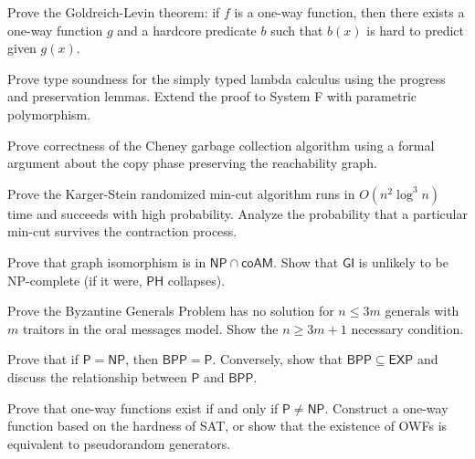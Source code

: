 \documentclass[12pt,a4paper]{exam}
\begin{document}
\begin{questions}
\vspace{0.3cm}

\question[5]
Prove the Goldreich-Levin theorem: if $f$ is a one-way function, then there exists a one-way function $g$ and a hardcore predicate $b$ such that $b(x)$ is hard to predict given $g(x)$.

\vspace{0.3cm}

\question[4]
Prove type soundness for the simply typed lambda calculus using the progress and preservation lemmas. Extend the proof to System F with parametric polymorphism.

\vspace{0.3cm}

\question[3]
Prove correctness of the Cheney garbage collection algorithm using a formal argument about the copy phase preserving the reachability graph.

\vspace{0.3cm}

\question[4]
Prove the Karger-Stein randomized min-cut algorithm runs in $O(n^2 \log^3 n)$ time and succeeds with high probability. Analyze the probability that a particular min-cut survives the contraction process.

\vspace{0.3cm}

\question[6]
Prove that graph isomorphism is in $\mathsf{NP} \cap \mathsf{coAM}$. Show that $\mathsf{GI}$ is unlikely to be NP-complete (if it were, $\mathsf{PH}$ collapses).

\vspace{0.3cm}

\question[3]
Prove the Byzantine Generals Problem has no solution for $n \leq 3m$ generals with $m$ traitors in the oral messages model. Show the $n \geq 3m+1$ necessary condition.

\vspace{0.3cm}

\question[5]
Prove that if $\mathsf{P} = \mathsf{NP}$, then $\mathsf{BPP} = \mathsf{P}$. Conversely, show that $\mathsf{BPP} \subseteq \mathsf{EXP}$ and discuss the relationship between $\mathsf{P}$ and $\mathsf{BPP}$.

\vspace{0.3cm}

\question[6]
Prove that one-way functions exist if and only if $\mathsf{P} \neq \mathsf{NP}$. Construct a one-way function based on the hardness of SAT, or show that the existence of OWFs is equivalent to pseudorandom generators.


\end{questions}
\end{document}
